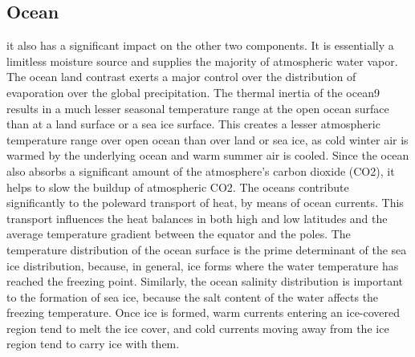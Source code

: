 \subsection{Ocean }
it also has a significant impact on the other two components. It is essentially a limitless moisture source and supplies the majority of atmospheric water vapor. The ocean land contrast exerts a major control over the distribution of evaporation over the global precipitation. The thermal inertia of the ocean9 results in a much lesser seasonal temperature range at the open ocean surface than at a land surface or a sea ice surface.
This creates a lesser atmospheric temperature range over open ocean than over land or sea ice, as cold winter air is warmed by the underlying ocean and warm summer air is cooled. Since the ocean also absorbs a significant amount of the atmosphere’s carbon dioxide (CO2), it helps to slow the buildup of atmospheric CO2.
The oceans contribute significantly to the poleward transport of heat, by means of ocean currents. This transport influences the heat balances in both high and low latitudes and the average temperature gradient between the equator and the poles. The temperature distribution of the ocean surface is the prime determinant of the sea ice distribution, because, in general, ice forms where the water temperature has reached the freezing point. Similarly, the ocean salinity distribution is important to the formation of sea ice, because the salt content of the water affects the freezing temperature. Once ice is formed, warm currents entering an ice-covered region tend to melt the ice cover, and cold currents moving away from the ice region tend to carry ice with them.

